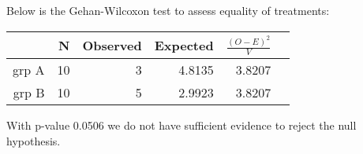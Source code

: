 \documentclass[11pt,a4paper]{article}
\begin{document}
\begin{itemize}
Below is the Gehan-Wilcoxon test to assess equality of treatments: 
\begin{table}[H]
\centering
\begin{tabular}{rrrrrr}
  \hline
  & N & Observed & Expected & $\frac{(O - E)^2}{V}$ \\ 
  \hline
  grp A & 10 & 3 & 4.8135 & 3.8207 \\ 
  grp B & 10 & 5 & 2.9923 & 3.8207 \\ 
   \hline
\end{tabular}
\end{table}
With p-value 0.0506 we do not have sufficient evidence to reject the null hypothesis.

\end{itemize}
\end{document}

